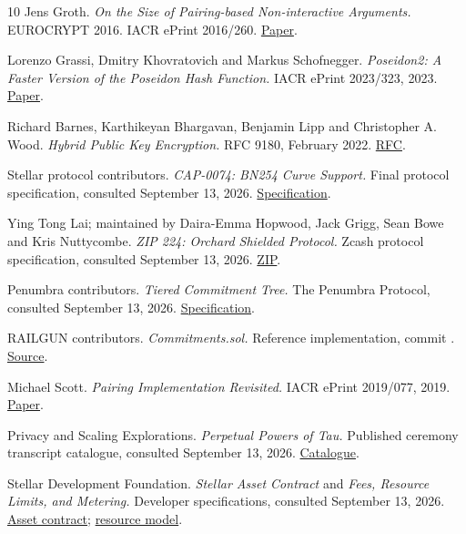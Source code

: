 \documentclass[11pt,letterpaper]{article}
\begin{document}
\clearpage
{}
\begin{thebibliography}{10}
Jens Groth. \emph{On the Size of Pairing-based Non-interactive
Arguments.} EUROCRYPT 2016. IACR ePrint 2016/\allowbreak{}260.
\href{https://eprint.iacr.org/2016/260}{Paper}.

Lorenzo Grassi, Dmitry Khovratovich and Markus Schofnegger.
\emph{Poseidon2: A Faster Version of the Poseidon Hash Function.} IACR
ePrint 2023/\allowbreak{}323, 2023.
\href{https://eprint.iacr.org/2023/323}{Paper}.

Richard Barnes, Karthikeyan Bhargavan, Benjamin Lipp and Christopher A.
Wood. \emph{Hybrid Public Key Encryption.} RFC 9180, February 2022.
\href{https://www.rfc-editor.org/rfc/rfc9180}{RFC}.

Stellar protocol contributors. \emph{CAP-0074: BN254 Curve Support.}
Final protocol specification, consulted September 13, 2026.
\href{https://github.com/stellar/stellar-protocol/blob/master/core/cap-0074.md}{Specification}.

Ying Tong Lai; maintained by Daira-Emma Hopwood, Jack Grigg, Sean Bowe
and Kris Nuttycombe. \emph{ZIP 224: Orchard Shielded Protocol.} Zcash
protocol specification, consulted September 13, 2026.
\href{https://zips.z.cash/zip-0224}{ZIP}.

Penumbra contributors. \emph{Tiered Commitment Tree.} The Penumbra
Protocol, consulted September 13, 2026.
\href{https://protocol.penumbra.zone/main/sct/tct.html}{Specification}.

RAILGUN contributors. \emph{Commitments.sol.} Reference implementation,
commit {\ttfamily{}}.
\href{https://github.com/Railgun-Privacy/contract/blob/2afd011854daf35aad155a91d6bf2397e39ca90d/contracts/logic/Commitments.sol}{Source}.

Michael Scott. \emph{Pairing Implementation Revisited.} IACR ePrint
2019/\allowbreak{}077, 2019.
\href{https://eprint.iacr.org/2019/077}{Paper}.

Privacy and Scaling Explorations. \emph{Perpetual Powers of Tau.}
Published ceremony transcript catalogue, consulted September 13, 2026.
\href{https://github.com/privacy-scaling-explorations/perpetualpowersoftau}{Catalogue}.

Stellar Development Foundation. \emph{Stellar Asset Contract} and
\emph{Fees, Resource Limits, and Metering.} Developer specifications,
consulted September 13, 2026.
\href{https://developers.stellar.org/docs/tokens/stellar-asset-contract}{Asset
contract};
\href{https://developers.stellar.org/docs/learn/fundamentals/fees-resource-limits-metering}{resource
model}.

\end{thebibliography}
\end{document}
